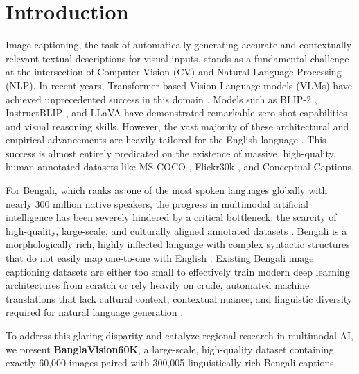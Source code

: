 \documentclass[conference]{IEEEtran}
\begin{document}
\section{Introduction}
Image captioning, the task of automatically generating accurate and contextually relevant textual descriptions for visual inputs, stands as a fundamental challenge at the intersection of Computer Vision (CV) and Natural Language Processing (NLP). In recent years, Transformer-based Vision-Language models (VLMs) have achieved unprecedented success in this domain \cite{li2023blip2, liu2023llava, bai2023qwenvl}. Models such as BLIP-2 \cite{li2023blip2}, InstructBLIP \cite{dai2023instructblip}, and LLaVA \cite{liu2023llava} have demonstrated remarkable zero-shot capabilities and visual reasoning skills. However, the vast majority of these architectural and empirical advancements are heavily tailored for the English language \cite{chen2024paligemma, radford2023clip}. This success is almost entirely predicated on the existence of massive, high-quality, human-annotated datasets like MS COCO \cite{lin2014microsoft}, Flickr30k \cite{young2014image}, and Conceptual Captions.

For Bengali, which ranks as one of the most spoken languages globally with nearly 300 million native speakers, the progress in multimodal artificial intelligence has been severely hindered by a critical bottleneck: the scarcity of high-quality, large-scale, and culturally aligned annotated datasets \cite{hossain2023bengali, rahman2024vision}. Bengali is a morphologically rich, highly inflected language with complex syntactic structures that do not easily map one-to-one with English \cite{chowdhury2023survey}. Existing Bengali image captioning datasets are either too small to effectively train modern deep learning architectures from scratch or rely heavily on crude, automated machine translations that lack cultural context, contextual nuance, and linguistic diversity required for natural language generation \cite{das2023captioning, sarker2024data}.

To address this glaring disparity and catalyze regional research in multimodal AI, we present \textbf{BanglaVision60K}, a large-scale, high-quality dataset containing exactly 60,000 images paired with 300,005 linguistically rich Bengali captions. 
\end{document}
